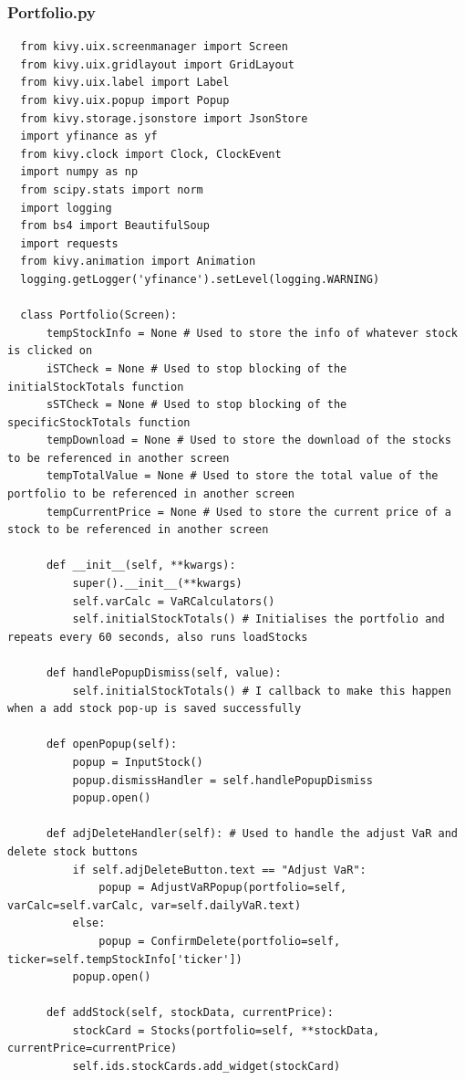\documentclass{article}
\begin{document}
\subsubsection{Portfolio.py}
\begin{verbatim}
  from kivy.uix.screenmanager import Screen
  from kivy.uix.gridlayout import GridLayout
  from kivy.uix.label import Label
  from kivy.uix.popup import Popup
  from kivy.storage.jsonstore import JsonStore
  import yfinance as yf
  from kivy.clock import Clock, ClockEvent
  import numpy as np
  from scipy.stats import norm
  import logging
  from bs4 import BeautifulSoup
  import requests
  from kivy.animation import Animation
  logging.getLogger('yfinance').setLevel(logging.WARNING)

  class Portfolio(Screen):
      tempStockInfo = None # Used to store the info of whatever stock is clicked on
      iSTCheck = None # Used to stop blocking of the initialStockTotals function
      sSTCheck = None # Used to stop blocking of the specificStockTotals function
      tempDownload = None # Used to store the download of the stocks to be referenced in another screen
      tempTotalValue = None # Used to store the total value of the portfolio to be referenced in another screen
      tempCurrentPrice = None # Used to store the current price of a stock to be referenced in another screen

      def __init__(self, **kwargs):
          super().__init__(**kwargs)
          self.varCalc = VaRCalculators() 
          self.initialStockTotals() # Initialises the portfolio and repeats every 60 seconds, also runs loadStocks

      def handlePopupDismiss(self, value):
          self.initialStockTotals() # I callback to make this happen when a add stock pop-up is saved successfully

      def openPopup(self):
          popup = InputStock()
          popup.dismissHandler = self.handlePopupDismiss
          popup.open() 

      def adjDeleteHandler(self): # Used to handle the adjust VaR and delete stock buttons
          if self.adjDeleteButton.text == "Adjust VaR":
              popup = AdjustVaRPopup(portfolio=self, varCalc=self.varCalc, var=self.dailyVaR.text)            
          else:
              popup = ConfirmDelete(portfolio=self, ticker=self.tempStockInfo['ticker'])
          popup.open()

      def addStock(self, stockData, currentPrice):
          stockCard = Stocks(portfolio=self, **stockData, currentPrice=currentPrice)
          self.ids.stockCards.add_widget(stockCard)


\end{verbatim}
\end{document}

